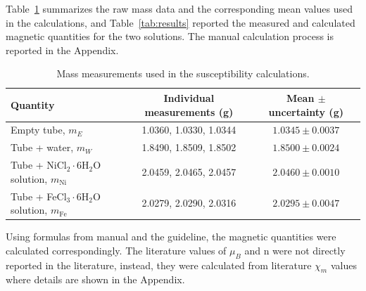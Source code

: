 \documentclass[12pt]{article}
\begin{document}
Table~\ref{tab:raw} summarizes the raw mass data and the corresponding mean values used in the calculations, and Table~\ref{tab:results} reported the measured and calculated magnetic quantities for the two solutions. The manual calculation process is reported in the Appendix.

\begin{table}[htbp]
    \centering
    \caption{Mass measurements used in the susceptibility calculations.}
    \label{tab:raw}
    \begin{tabular}{p{2.8in}cc}
        \toprule
        Quantity & Individual measurements (g) & Mean $\pm$ uncertainty (g)\\
        \midrule
        Empty tube, $m_E$ & 1.0360, 1.0330, 1.0344 & $1.0345 \pm 0.0037$ \\
        Tube + water, $m_W$ & 1.8490, 1.8509, 1.8502 & $1.8500 \pm 0.0024$ \\
        Tube + NiCl$_2\cdot$6H$_2$O solution, $m_{\mathrm{Ni}}$ & 2.0459, 2.0465, 2.0457 & $2.0460 \pm 0.0010$ \\
        Tube + FeCl$_3\cdot$6H$_2$O solution, $m_{\mathrm{Fe}}$ & 2.0279, 2.0290, 2.0316 & $2.0295 \pm 0.0047$ \\
        \bottomrule
    \end{tabular}
\end{table}

Using formulas from manual \cite{lab_manual} and the guideline, the magnetic quantities were calculated correspondingly. The literature values of $\mu_B$ and n were not directly reported in the literature, instead, they were calculated from literature $\chi_m$ values where details are shown in the Appendix.\cite{miller1985litmag,masson1957litmag}
\end{document}
